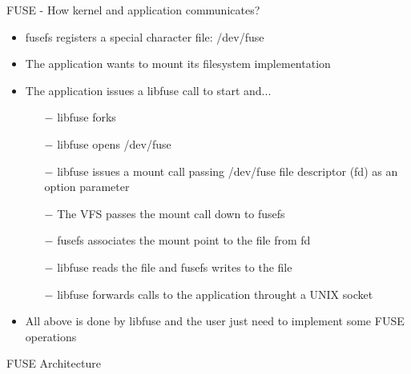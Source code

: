 \documentclass{beamer}
\begin{document}
\begin{frame}{FUSE - How kernel and application communicates?}
	
	\begin{itemize}[<+->]

		\item{fusefs registers a special character file: /dev/fuse}
		\item{The application wants to mount its filesystem implementation}
		\item{The application issues a libfuse call to start and...}
		\begin{itemize}
			\item[$-$]{libfuse forks}
			\item[$-$]{libfuse opens /dev/fuse}
			\item[$-$]{libfuse issues a mount call passing /dev/fuse file descriptor (fd) as an option parameter}
			\item[$-$]{The VFS passes the mount call down to fusefs}
			\item[$-$]{fusefs associates the mount point to the file from fd}
			\item[$-$]{libfuse reads the file and fusefs writes to the file}
			\item[$-$]{libfuse forwards calls to the application throught a UNIX socket}			
		\end{itemize}
		\item{All above is done by libfuse and the user just need to implement some FUSE operations}

	\end{itemize}
	
	\let\thefootnote\relax{}
	
\end{frame}

\begin{frame}{FUSE Architecture}
	
	
	\let\thefootnote\relax{}
	
\end{frame}
\end{document}
